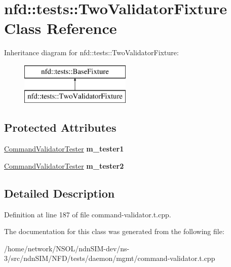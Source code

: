 \hypertarget{classnfd_1_1tests_1_1TwoValidatorFixture}{}\section{nfd\+:\+:tests\+:\+:Two\+Validator\+Fixture Class Reference}
\label{classnfd_1_1tests_1_1TwoValidatorFixture}
Inheritance diagram for nfd\+:\+:tests\+:\+:Two\+Validator\+Fixture\+:\begin{figure}[H]
\begin{center}
\leavevmode
\includegraphics[height=2.000000cm]{classnfd_1_1tests_1_1TwoValidatorFixture}
\end{center}
\end{figure}
\subsection*{Protected Attributes}
\begin{DoxyCompactItemize}
\item 
\hyperlink{classnfd_1_1tests_1_1CommandValidatorTester}{Command\+Validator\+Tester} {\bfseries m\+\_\+tester1}\hypertarget{classnfd_1_1tests_1_1TwoValidatorFixture_a242d55503353f2bf12bc4e71ba5219a4}{}\label{classnfd_1_1tests_1_1TwoValidatorFixture_a242d55503353f2bf12bc4e71ba5219a4}

\item 
\hyperlink{classnfd_1_1tests_1_1CommandValidatorTester}{Command\+Validator\+Tester} {\bfseries m\+\_\+tester2}\hypertarget{classnfd_1_1tests_1_1TwoValidatorFixture_a3f60a4a7a765b66fe2f672da122d271b}{}\label{classnfd_1_1tests_1_1TwoValidatorFixture_a3f60a4a7a765b66fe2f672da122d271b}

\end{DoxyCompactItemize}


\subsection{Detailed Description}


Definition at line 187 of file command-\/validator.\+t.\+cpp.



The documentation for this class was generated from the following file\+:\begin{DoxyCompactItemize}
\item 
/home/network/\+N\+S\+O\+L/ndn\+S\+I\+M-\/dev/ns-\/3/src/ndn\+S\+I\+M/\+N\+F\+D/tests/daemon/mgmt/command-\/validator.\+t.\+cpp\end{DoxyCompactItemize}
